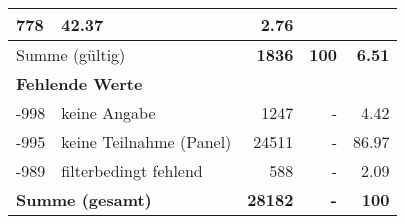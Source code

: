 \begin{longtable}{lXrrr}
       \num{778} &
       \num[round-mode=places,round-precision=2]{42,37} &
         \num[round-mode=places,round-precision=2]{2,76} \\
     \midrule
     \multicolumn{2}{l}{Summe (gültig)} &
       \textbf{\num{1836}} &
     \textbf{100} &
       \textbf{\num[round-mode=places,round-precision=2]{6,51}} \\
     \multicolumn{5}{l}{\textbf{Fehlende Werte}}\\
       -998 &
       keine Angabe &
         \num{1247} &
        - &
         \num[round-mode=places,round-precision=2]{4,42} \\
       -995 &
       keine Teilnahme (Panel) &
         \num{24511} &
        - &
         \num[round-mode=places,round-precision=2]{86,97} \\
       -989 &
       filterbedingt fehlend &
         \num{588} &
        - &
         \num[round-mode=places,round-precision=2]{2,09} \\
     \midrule
     \multicolumn{2}{l}{\textbf{Summe (gesamt)}} &
          \textbf{\num{28182}} &
        \textbf{-} &
        \textbf{100} \\
     \bottomrule
     \end{longtable}
     
